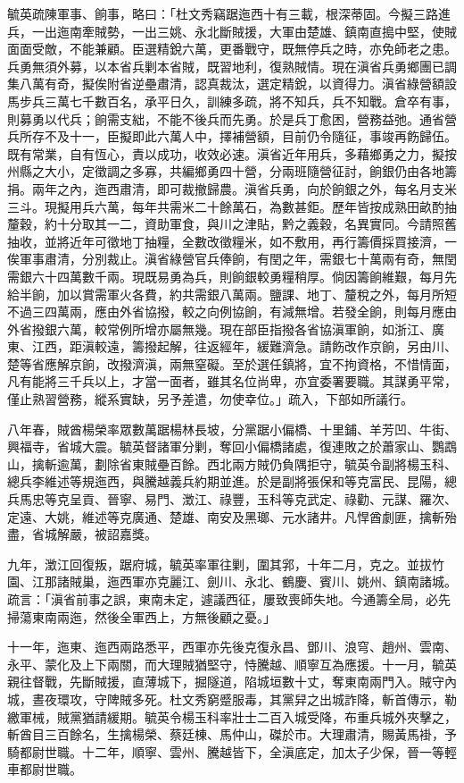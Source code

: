 \begin{pinyinscope}
毓英疏陳軍事、餉事，略曰：「杜文秀竊踞迤西十有三載，根深蒂固。今擬三路進兵，一出迤南牽賊勢，一出三姚、永北斷賊援，大軍由楚雄、鎮南直搗中堅，使賊面面受敵，不能兼顧。臣選精銳六萬，更番戰守，既無停兵之時，亦免師老之患。兵勇無須外募，以本省兵剿本省賊，既習地利，復熟賊情。現在滇省兵勇鄉團已調集八萬有奇，擬俟附省逆壘肅清，認真裁汰，選定精銳，以資得力。滇省綠營額設馬步兵三萬七千數百名，承平日久，訓練多疏，將不知兵，兵不知戰。倉卒有事，則募勇以代兵；餉需支絀，不能不後兵而先勇。於是兵丁愈困，營務益弛。通省營兵所存不及十一，臣擬即此六萬人中，擇補營額，目前仍令隨征，事竣再飭歸伍。既有常業，自有恆心，責以成功，收效必速。滇省近年用兵，多藉鄉勇之力，擬按州縣之大小，定徵調之多寡，共編鄉勇四十營，分兩班隨營征討，餉銀仍由各地籌捐。兩年之內，迤西肅清，即可裁撤歸農。滇省兵勇，向於餉銀之外，每名月支米三斗。現擬用兵六萬，每年共需米二十餘萬石，為數甚鉅。歷年皆按成熟田畝酌抽釐穀，約十分取其一二，資助軍食，與川之津貼，黔之義穀，名異實同。今請照舊抽收，並將近年可徵地丁抽糧，全數改徵糧米，如不敷用，再行籌價採買接濟，一俟軍事肅清，分別裁止。滇省綠營官兵俸餉，有閏之年，需銀七十萬兩有奇，無閏需銀六十四萬數千兩。現既易勇為兵，則餉銀較勇糧稍厚。倘因籌餉維艱，每月先給半餉，加以賞需軍火各費，約共需銀八萬兩。鹽課、地丁、釐稅之外，每月所短不過三四萬兩，應由外省協撥，較之向例協餉，有減無增。若發全餉，則每月應由外省撥銀六萬，較常例所增亦屬無幾。現在部臣指撥各省協滇軍餉，如浙江、廣東、江西，距滇較遠，籌撥起解，往返經年，緩難濟急。請飭改作京餉，另由川、楚等省應解京餉，改撥濟滇，兩無窒礙。至於選任鎮將，宜不拘資格，不惜情面，凡有能將三千兵以上，才當一面者，雖其名位尚卑，亦宜委署要職。其謀勇平常，僅止熟習營務，縱系實缺，另予差遣，勿使幸位。」疏入，下部如所議行。

八年春，賊酋楊榮率眾數萬踞楊林長坡，分黨踞小偏橋、十里鋪、羊芳凹、牛街、興福寺，省城大震。毓英督諸軍分剿，奪回小偏橋諸處，復連敗之於蕭家山、鸚鵡山，擒斬逾萬，劃除省東賊壘百餘。西北兩方賊仍負隅拒守，毓英令副將楊玉科、總兵李維述等規迤西，與騰越義兵約期並進。於是副將張保和等克富民、昆陽，總兵馬忠等克呈貢、晉寧、易門、澂江、祿豐，玉科等克武定、祿勸、元謀、羅次、定遠、大姚，維述等克廣通、楚雄、南安及黑瑯、元水諸井。凡悍酋劇匪，擒斬殆盡，省城解嚴，被詔嘉獎。

九年，澂江回復叛，踞府城，毓英率軍往剿，圍其郛，十年二月，克之。並拔竹園、江那諸賊巢，迤西軍亦克麗江、劍川、永北、鶴慶、賓川、姚州、鎮南諸城。疏言：「滇省前事之誤，東南未定，遽議西征，屢致喪師失地。今通籌全局，必先掃蕩東南兩迤，然後全軍西上，方無後顧之憂。」

十一年，迤東、迤西兩路悉平，西軍亦先後克復永昌、鄧川、浪穹、趙州、雲南、永平、蒙化及上下兩關，而大理賊猶堅守，恃騰越、順寧互為應援。十一月，毓英親往督戰，先斷賊援，直薄城下，掘隧道，陷城垣數十丈，奪東南兩門入。賊守內城，晝夜環攻，守陴賊多死。杜文秀窮蹙服毒，其黨舁之出城詐降，斬首傳示，勒繳軍械，賊黨猶請緩期。毓英令楊玉科率壯士二百入城受降，布重兵城外夾擊之，斬酋目三百餘名，生擒楊榮、蔡廷棟、馬仲山，磔於市。大理肅清，賜黃馬褂，予騎都尉世職。十二年，順寧、雲州、騰越皆下，全滇底定，加太子少保，晉一等輕車都尉世職。


\end{pinyinscope}
